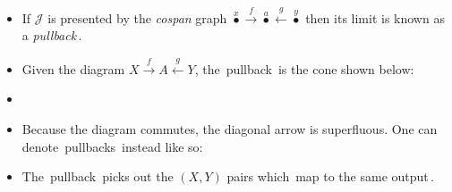 
\begin{itemize}
    \item If $\mathcal{J}$ is presented by the \emph{cospan} graph $\boxed{\overset{x}\bullet \xrightarrow{f} \overset{a}\bullet \xleftarrow{g}\overset{y}\bullet}$ then its limit is known as \,a \emph{pullback}\,.
    \item Given the diagram $X \xrightarrow{f}A\xleftarrow{g}Y$, the \,pullback\, is the cone shown below:

    \item {}

    \item Because the diagram commutes, the diagonal arrow is superfluous. One can denote \,pullbacks\, instead like so:


    \item The \,pullback\, picks out the $(X,Y)$ pairs which \,map to the same output\,.
  \end{itemize}